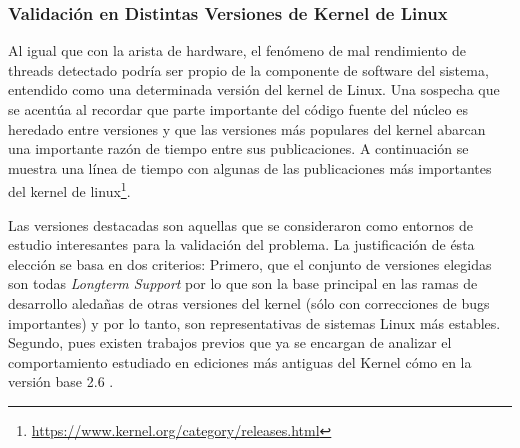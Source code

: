 \subsubsection{Validación en Distintas Versiones de Kernel de Linux}

Al igual que con la arista de hardware, el fenómeno de mal rendimiento de threads detectado podría ser propio de la componente de software del sistema, entendido como una determinada versión del kernel de Linux. Una sospecha que se acentúa al recordar que parte importante del código fuente del núcleo es heredado entre versiones y que las versiones más populares del kernel abarcan una importante razón de tiempo entre sus publicaciones. A continuación se muestra una línea de tiempo con algunas de las publicaciones más importantes del kernel de linux\footnote{\url{https://www.kernel.org/category/releases.html}}.


\begin{center}
\end{center}

Las versiones destacadas son aquellas que se consideraron como entornos de estudio interesantes para la validación del problema. La justificación de ésta elección se basa en dos criterios: Primero, que el conjunto de versiones elegidas son todas \emph{Longterm Support} por lo que son la base principal en las ramas de desarrollo aledañas de otras versiones del kernel (sólo con correcciones de bugs importantes) y por lo tanto, son representativas de sistemas Linux más estables. Segundo, pues existen trabajos previos que ya se encargan de analizar el comportamiento estudiado en ediciones más antiguas del Kernel cómo en la versión base 2.6 \cite{tesis:diegoDCC}.

